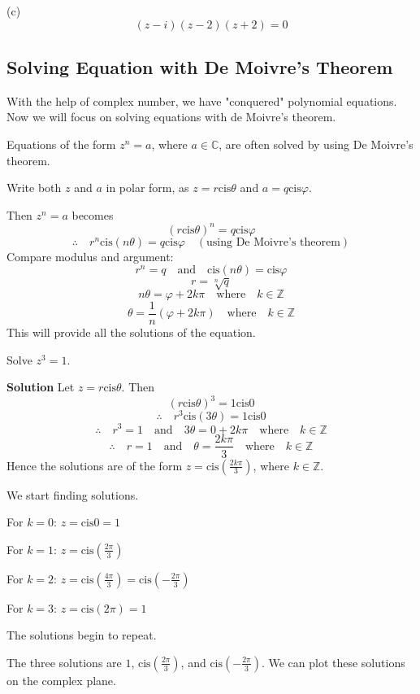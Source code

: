 (c)
\[
(z - i)(z - 2)(z + 2) = 0
\]
\subsection{Solving Equation with De Moivre's Theorem}
With the help of complex number, we have "conquered" polynomial equations. Now we will focus on solving
equations with de Moivre's theorem. 

Equations of the form $z^n = a$, where $a \in \mathbb{C}$, are often solved by using De Moivre's theorem.

Write both $z$ and $a$ in polar form, as $z = r \text{cis} \theta$ and $a = q \text{cis} \varphi$.

Then $z^n = a$ becomes
\[
(r \text{cis} \theta)^n = q \text{cis} \varphi
\]
\[
\therefore \quad r^n \text{cis}(n\theta) = q \text{cis} \varphi \quad (\text{using De Moivre's theorem})
\]
Compare modulus and argument:
\[
r^n = q \quad \text{and} \quad \text{cis}(n\theta) = \text{cis} \varphi
\]
\[
r = \sqrt[n]{q}
\]
\[
n\theta = \varphi + 2k\pi \quad \text{where} \quad k \in \mathbb{Z}
\]
\[
\theta = \frac{1}{n} (\varphi + 2k\pi) \quad \text{where} \quad k \in \mathbb{Z}
\]
This will provide all the solutions of the equation.

\begin{example}
    Solve \( z^3 = 1 \).
\end{example}
\textbf{Solution}
Let \( z = r \text{cis} \theta \). Then
\[
(r \text{cis} \theta)^3 = 1 \text{cis} 0
\]
\[
\therefore \quad r^3 \text{cis}(3\theta) = 1 \text{cis} 0
\]
\[
\therefore \quad r^3 = 1 \quad \text{and} \quad 3\theta = 0 + 2k\pi \quad \text{where} \quad k \in \mathbb{Z}
\]
\[
\therefore \quad r = 1 \quad \text{and} \quad \theta = \frac{2k\pi}{3} \quad \text{where} \quad k \in \mathbb{Z}
\]
Hence the solutions are of the form \( z = \text{cis}\left(\frac{2k\pi}{3}\right) \), where \( k \in \mathbb{Z} \).

We start finding solutions.

For \( k = 0 \): \( z = \text{cis} 0 = 1 \)

For \( k = 1 \): \( z = \text{cis}\left(\frac{2\pi}{3}\right) \)

For \( k = 2 \): \( z = \text{cis}\left(\frac{4\pi}{3}\right) = \text{cis}\left(-\frac{2\pi}{3}\right) \)

For \( k = 3 \): \( z = \text{cis}(2\pi) = 1 \)

The solutions begin to repeat.

The three solutions are \( 1 \), \( \text{cis}\left(\frac{2\pi}{3}\right) \), and \( \text{cis}\left(-\frac{2\pi}{3}\right) \).
We can plot these solutions on the complex plane.

